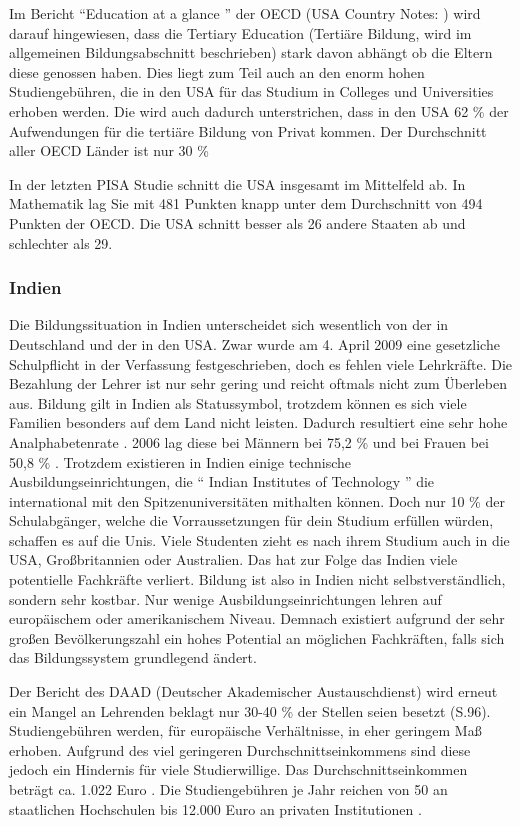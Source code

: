 Im Bericht ``Education at a glance '' der OECD (USA Country Notes: \cite{oecd4}) wird darauf hingewiesen, dass die Tertiary Education (Tertiäre Bildung, wird im allgemeinen Bildungsabschnitt beschrieben) stark davon abhängt ob die Eltern diese genossen haben. Dies liegt zum Teil auch an den enorm hohen Studiengebühren, die in den USA für das Studium in Colleges und Universities erhoben werden. Die wird auch dadurch unterstrichen, dass in den USA 62 \% der Aufwendungen für die tertiäre Bildung von Privat kommen. Der Durchschnitt aller OECD Länder ist nur 30 \%

In der letzten PISA Studie schnitt die USA insgesamt im Mittelfeld ab. In Mathematik lag Sie mit 481 Punkten knapp unter dem Durchschnitt von 494 Punkten der OECD. Die USA schnitt besser als 26 andere Staaten ab und schlechter als 29. \cite{pisa2}

\subsubsection*{Indien}

Die Bildungssituation in Indien unterscheidet sich wesentlich von der in Deutschland und der in den USA. Zwar wurde am 4. April 2009 eine gesetzliche Schulpflicht in der Verfassung festgeschrieben, doch es fehlen viele Lehrkräfte. \cite{dw} Die Bezahlung der Lehrer ist nur sehr gering und reicht oftmals nicht zum Überleben aus. Bildung gilt in Indien als Statussymbol, trotzdem können es sich viele Familien besonders auf dem Land nicht leisten. Dadurch resultiert eine sehr hohe Analphabetenrate \cite{analpha}. 2006 lag diese bei Männern bei 75,2 \% und bei Frauen bei 50,8 \% .
Trotzdem existieren in Indien einige technische Ausbildungseinrichtungen, die `` Indian Institutes of Technology '' die international mit den Spitzenuniversitäten mithalten können. Doch nur 10 \% der Schulabgänger, welche die Vorraussetzungen für dein Studium erfüllen würden, schaffen es auf die Unis. Viele Studenten zieht es nach ihrem Studium auch in die USA, Großbritannien oder Australien. Das hat zur Folge das Indien viele potentielle Fachkräfte verliert.
Bildung ist also in Indien nicht selbstverständlich, sondern sehr kostbar. Nur wenige Ausbildungseinrichtungen lehren auf europäischem oder amerikanischem Niveau. Demnach existiert aufgrund der sehr großen Bevölkerungszahl ein hohes Potential an möglichen Fachkräften, falls sich das Bildungssystem grundlegend ändert.

Der Bericht des DAAD (Deutscher Akademischer Austauschdienst) \cite{daad} wird erneut ein Mangel an Lehrenden beklagt nur 30-40 \% der Stellen seien besetzt (S.96).
Studiengebühren werden, für europäische Verhältnisse, in eher geringem Maß erhoben. Aufgrund des viel geringeren Durchschnittseinkommens sind diese jedoch ein Hindernis für viele Studierwillige. Das Durchschnittseinkommen beträgt ca. 1.022 Euro \cite{ausa}. Die Studiengebühren je Jahr reichen von 50 an staatlichen Hochschulen bis 12.000 Euro an privaten Institutionen \cite[101]{daad}.


